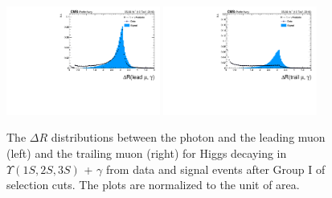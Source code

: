 \begin{figure}[!htbp]
\begin{center}
\includegraphics[width=0.45\textwidth]{figures/outputPlots/HtoUpsilon_Cat0_ZZZZZ/au/data_x_mc/noKinCuts/h_noKin_deltaR_Leading_Photon}\hspace*{1.cm}
\includegraphics[width=0.45\textwidth]{figures/outputPlots/HtoUpsilon_Cat0_ZZZZZ/au/data_x_mc/noKinCuts/h_noKin_deltaR_Trailing_Photon}\end{center}\vspace*{-.5cm}
\caption{The $\Delta R$ distributions between the photon and the leading muon (left) and the trailing muon (right) for Higgs decaying in $\Upsilon(1S,2S,3S)$ + $\gamma$ from data and signal events after Group I of selection cuts. The plots are normalized to the unit of area.}
\label{fig:deltaR_HtoUpsilon_Cat0}
\end{figure}

